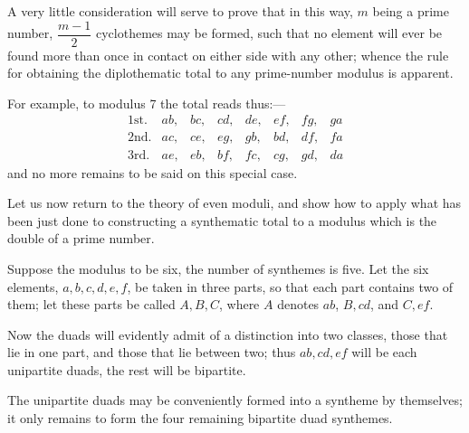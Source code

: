 \documentclass[11pt]{article}
\newcommand{\sourcepage}[1]{\marginpar{\scriptsize p.~#1}}
\begin{document}
{{\sourcepage{94}
A very little consideration will serve to prove that in this way, $m$ being a prime number, $\dfrac{m-1}{2}$ cyclothemes may be formed, such that no element will ever be found more than once in contact on either side with any other; whence the rule for obtaining the diplothematic total to any prime-number modulus is apparent.

For example, to modulus 7 the total reads thus:---
\[
\begin{array}{rlllllll}
\text{1st.}&ab,&bc,&cd,&de,&ef,&fg,&ga\\
\text{2nd.}&ac,&ce,&eg,&gb,&bd,&df,&fa\\
\text{3rd.}&ae,&eb,&bf,&fc,&cg,&gd,&da
\end{array}
\]
and no more remains to be said on this special case.

Let us now return to the theory of even moduli, and show how to apply what has been just done to constructing a synthematic total to a modulus which is the double of a prime number.

Suppose the modulus to be six, the number of synthemes is five. Let the six elements, $a,b,c,d,e,f$, be taken in three parts, so that each part contains two of them; let these parts be called $A,B,C$, where $A$ denotes $ab$, $B,cd$, and $C,ef$.

Now the duads will evidently admit of a distinction into two classes, those that lie in one part, and those that lie between two; thus $ab,cd,ef$ will be each unipartite duads, the rest will be bipartite.

The unipartite duads may be conveniently formed into a syntheme by themselves; it only remains to form the four remaining bipartite duad synthemes.

}}
\end{document}
